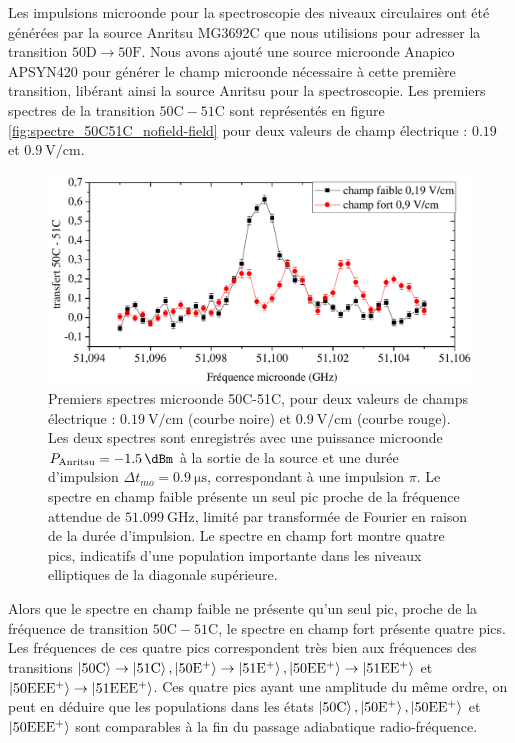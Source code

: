 \noindent Les impulsions microonde pour la spectroscopie des niveaux circulaires ont été générées par la source Anritsu MG3692C que nous utilisions pour adresser la transition $\mathrm{50D \rightarrow 50F}$.
Nous avons ajouté une source microonde Anapico APSYN420 pour générer le champ microonde nécessaire à cette première transition, libérant ainsi la source Anritsu pour la spectroscopie.
Les premiers spectres  de la transition $\mathrm{50C-51C}$ sont représentés en figure \eqref{fig:spectre_50C51C_nofield-field} pour deux valeurs de champ électrique : $\SI{0.19}{}$ et $\SI{0.9}{\V/\cm}$.
%
\begin{figure}[h]
\centering
\includegraphics[width=.85\linewidth]{figures/circulars/spectre_50C51C_nofield-field}
\caption[Premiers spectres microonde 50C-51C]{
Premiers spectres microonde 50C-51C, pour deux valeurs de champs électrique :
$\SI{0.19}{\V/\cm}$ (courbe noire) et $\SI{0.9}{\V/\cm}$ (courbe rouge).
Les deux spectres sont enregistrés avec une puissance microonde $P_{\text{Anritsu}} = \SI{-1.5}{\dBm}$ à la sortie de la source et une durée d'impulsion $\Delta t _{mo} = \SI{0.9}{\us}$, correspondant à une impulsion $\pi$.
Le spectre en champ faible présente un seul pic proche de la fréquence attendue de $\SI{51.099}{\GHz}$, limité par transformée de Fourier en raison de la durée d'impulsion.
Le spectre en champ \og fort \fg{} montre quatre pics, indicatifs d'une population importante dans les niveaux elliptiques de la diagonale supérieure.
}
\label{fig:spectre_50C51C_nofield-field}
\end{figure}
%
Alors que le spectre en champ faible ne présente qu'un seul pic, proche de la fréquence de transition $\mathrm{50C-51C}$, le spectre en champ fort présente quatre pics.
Les fréquences de ces quatre pics correspondent très bien aux fréquences des transitions
$\mathrm{\ket{50C}\rightarrow\ket{51C}, \ket{50E^+}\rightarrow\ket{51E^+}, \ket{50EE^+}\rightarrow\ket{51EE^+}}$ et $\mathrm{\ket{50EEE^+}\rightarrow\ket{51EEE^+}}$.
Ces quatre pics ayant une amplitude du même ordre, on peut en déduire que les populations dans les états
$\mathrm{\ket{50C}, \ket{50E^+}, \ket{50EE^+}}$ et $\mathrm{\ket{50EEE^+}}$ sont comparables à la fin du passage adiabatique radio-fréquence.


